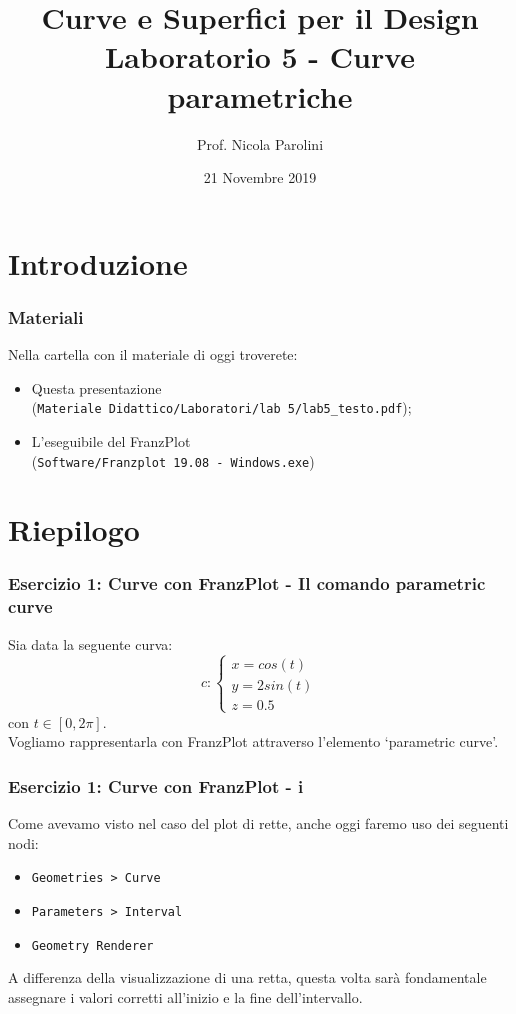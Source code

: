 \documentclass{beamer}
\title[Curve e Sup. - Lab 5]{Curve e Superfici per il Design \\ Laboratorio 5 - Curve parametriche}
\author[Prof.ssa Scotti]{Prof. Nicola Parolini}
\date{21 Novembre 2019}
\newcommand{\frnzplt}{FranzPlot }
\begin{document}
\begin{frame}
\maketitle
\end{frame}
\section{Introduzione}
\begin{frame}
\frametitle{Materiali}
Nella cartella con il materiale di oggi troverete:
\begin{itemize}
\item Questa presentazione \\ (\texttt{Materiale Didattico/Laboratori/lab 5/lab5\_testo.pdf});
\item L'eseguibile del \frnzplt \\ (\texttt{Software/Franzplot 19.08 - Windows.exe})
\end{itemize}
\end{frame}

\section{Riepilogo}
%
\begin{frame}
\frametitle{Esercizio 1: Curve con \frnzplt - Il comando parametric curve}
Sia data la seguente curva:
\begin{displaymath}
c:
\begin{cases}
    x = cos(t)\\
    y = 2 sin(t)\\
    z = 0.5
\end{cases}
\end{displaymath}
    con $t \in [0, 2\pi]$. \\
Vogliamo rappresentarla con \frnzplt attraverso l'elemento `parametric curve'.
\end{frame}
%

\begin{frame}
\frametitle{Esercizio 1: Curve con \frnzplt - i}
    Come avevamo visto nel caso del plot di rette, anche oggi faremo uso dei seguenti nodi:
    \begin{itemize}
        \item \texttt{Geometries > Curve} 
        \item \texttt{Parameters > Interval}
        \item \texttt{Geometry Renderer}
    \end{itemize}

    \vspace{0.5cm}
    A differenza della visualizzazione di una retta, questa volta sar\`a fondamentale assegnare i valori corretti
    all'inizio e la fine dell'intervallo.
\end{frame}
%
\end{document}
